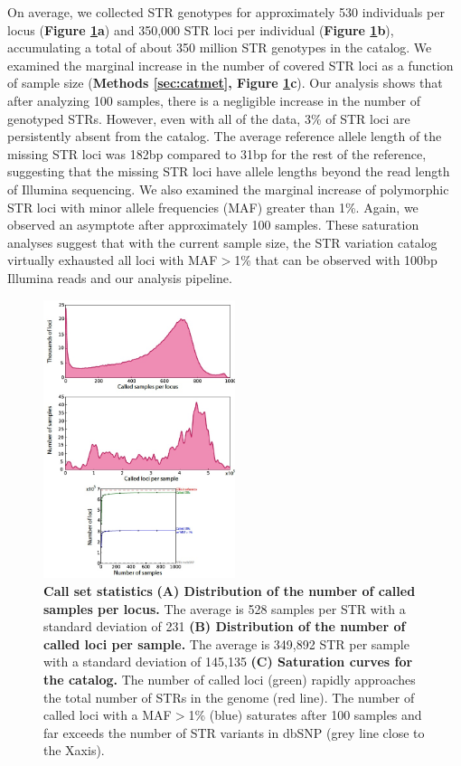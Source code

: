 On average, we collected STR genotypes for approximately 530 individuals per locus (\textbf{Figure \ref{fig:catfig1}a}) and 350,000 STR loci per individual (\textbf{Figure \ref{fig:catfig1}b}), accumulating a total of about 350 million STR genotypes in the catalog. We examined the marginal increase in the number of covered STR loci as a function of sample size (\textbf{Methods \ref{sec:catmet}, Figure \ref{fig:catfig1}c}). Our analysis shows that after analyzing 100 samples, there is a negligible increase in the number of genotyped STRs. However, even with all of the data, 3\% of STR loci are persistently absent from the catalog. The average reference allele length of the missing STR loci was 182bp compared to 31bp for the rest of the reference, suggesting that the missing STR loci have allele lengths beyond the read length of Illumina sequencing. We also examined the marginal increase of polymorphic STR loci with minor allele frequencies (MAF) greater than 1\%. Again, we observed an asymptote after approximately 100 samples. These saturation analyses suggest that with the current sample size, the STR variation catalog virtually exhausted all loci with MAF$>$1\% that can be observed with 100bp Illumina reads and our analysis pipeline.  

\begin{figure}[h!]
\centering
\label{fig:catfig1}
\includegraphics[width=0.5\textwidth]{Figures/Chapter3/Fig1.jpg}
\caption{\textbf{Call set statistics} \textbf{(A) Distribution of the number of called samples per locus.} The average is 528 samples per STR with a standard deviation of 231 \textbf{(B) Distribution of the number of called loci per sample.} The average is 349,892 STR per sample with a standard deviation of 145,135 \textbf{(C) Saturation curves for the catalog.} The number of called loci (green) rapidly approaches the total number of STRs in the genome (red line). The number of called loci with a MAF$>$1\% (blue) saturates after 100 samples and far exceeds the number of STR variants in dbSNP (grey line close to the Xaxis).}
\end{figure}

